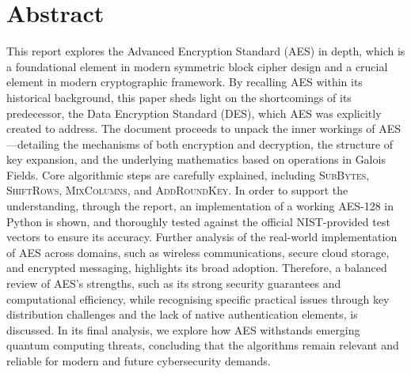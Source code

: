 \section*{Abstract} %

This report explores the Advanced Encryption Standard (AES) in depth, which is a foundational element in modern symmetric block cipher design and a crucial element in modern cryptographic framework. 
By recalling AES within its historical background, this paper sheds light on the shortcomings of its predecessor, the Data Encryption Standard (DES), which AES was explicitly created to address. 
The document proceeds to unpack the inner workings of AES—detailing the mechanisms of both encryption and decryption, the structure of key expansion, and the underlying mathematics based on operations in Galois Fields. 
Core algorithmic steps are carefully explained, including \textsc{SubBytes}, \textsc{ShiftRows}, \textsc{MixColumns}, and \textsc{AddRoundKey}. 
In order to support the understanding, through the report, an implementation of a working AES-128 in Python is shown, and thoroughly tested against the official NIST-provided test vectors to ensure its accuracy.
Further analysis of the real-world implementation of AES across domains, such as wireless communications, secure cloud storage, and encrypted messaging, highlights its broad adoption. 
Therefore, a balanced review of AES's strengths, such as its strong security guarantees and computational efficiency, while recognising specific practical issues through key distribution challenges and the lack of native authentication elements, is discussed. 
In its final analysis, we explore how AES withstands emerging quantum computing threats, concluding that the algorithms remain relevant and reliable for modern and future cybersecurity demands.